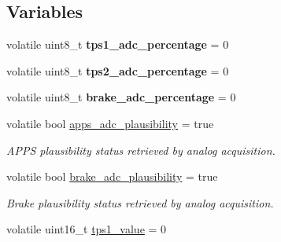 \subsection*{Variables}
\begin{DoxyCompactItemize}
\item 
\hypertarget{group___board__model__group_ga7c7f5690cca986bc3fb2f6dcbda24690}{volatile uint8\-\_\-t {\bfseries tps1\-\_\-adc\-\_\-percentage} = 0}\label{group___board__model__group_ga7c7f5690cca986bc3fb2f6dcbda24690}

\item 
\hypertarget{group___board__model__group_gae1f465253d690605c0948394a3f055f4}{volatile uint8\-\_\-t {\bfseries tps2\-\_\-adc\-\_\-percentage} = 0}\label{group___board__model__group_gae1f465253d690605c0948394a3f055f4}

\item 
\hypertarget{group___board__model__group_ga709add26e40f60e3add32981ea2a5868}{volatile uint8\-\_\-t {\bfseries brake\-\_\-adc\-\_\-percentage} = 0}\label{group___board__model__group_ga709add26e40f60e3add32981ea2a5868}

\item 
\hypertarget{group___board__model__group_ga3e919d1e6477d52b4ccddd497351d3ec}{volatile bool \hyperlink{group___board__model__group_ga3e919d1e6477d52b4ccddd497351d3ec}{apps\-\_\-adc\-\_\-plausibility} = true}\label{group___board__model__group_ga3e919d1e6477d52b4ccddd497351d3ec}

\begin{DoxyCompactList}\small\item\em A\-P\-P\-S plausibility status retrieved by analog acquisition. \end{DoxyCompactList}\item 
\hypertarget{group___board__model__group_gaf6aa7f974533c4306128757d0634572a}{volatile bool \hyperlink{group___board__model__group_gaf6aa7f974533c4306128757d0634572a}{brake\-\_\-adc\-\_\-plausibility} = true}\label{group___board__model__group_gaf6aa7f974533c4306128757d0634572a}

\begin{DoxyCompactList}\small\item\em Brake plausibility status retrieved by analog acquisition. \end{DoxyCompactList}\item 
\hypertarget{group___board__model__group_ga3d6043851868b7da3c1d6381f835a559}{volatile uint16\-\_\-t \hyperlink{group___board__model__group_ga3d6043851868b7da3c1d6381f835a559}{tps1\-\_\-value} = 0}\label{group___board__model__group_ga3d6043851868b7da3c1d6381f835a559}


\end{DoxyCompactItemize}

